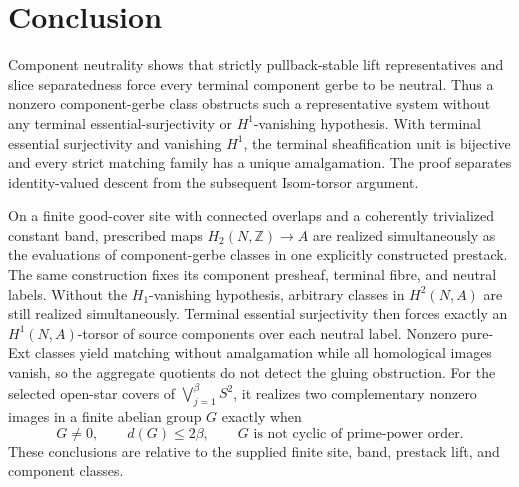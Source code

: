 \section{Conclusion}\label{sec:conclusion}

Component neutrality shows that strictly pullback-stable lift
representatives and slice separatedness force every terminal component gerbe
to be neutral.  Thus a nonzero component-gerbe class obstructs such a
representative system without any terminal essential-surjectivity or
\(H^1\)-vanishing hypothesis.  With terminal essential surjectivity and
vanishing \(H^1\), the terminal sheafification unit is bijective and every
strict matching family has a unique amalgamation.  The proof separates
identity-valued descent from the subsequent Isom-torsor argument.

On a finite good-cover site with connected overlaps and a coherently
trivialized constant band, prescribed maps
\(H_2(N,\mathbb Z)\to A\) are realized simultaneously as the evaluations of
component-gerbe classes in one explicitly constructed prestack.  The same
construction fixes its component presheaf, terminal fibre, and neutral
labels.  Without the \(H_1\)-vanishing hypothesis, arbitrary classes in
\(H^2(N,A)\) are still realized simultaneously.  Terminal essential
surjectivity then forces exactly an \(H^1(N,A)\)-torsor of source components
over each neutral label.  Nonzero pure-Ext classes yield matching without
amalgamation while all homological images vanish, so the aggregate quotients
do not detect the gluing obstruction.  For the selected open-star covers of
\(\bigvee_{j=1}^{\beta}S^2\), it realizes two complementary nonzero images
in a finite abelian group \(G\) exactly when
\[
 G\ne0,\qquad d(G)\le2\beta,\qquad
 G\text{ is not cyclic of prime-power order}.
\]
These conclusions are relative to the supplied finite site, band, prestack
lift, and component classes.
